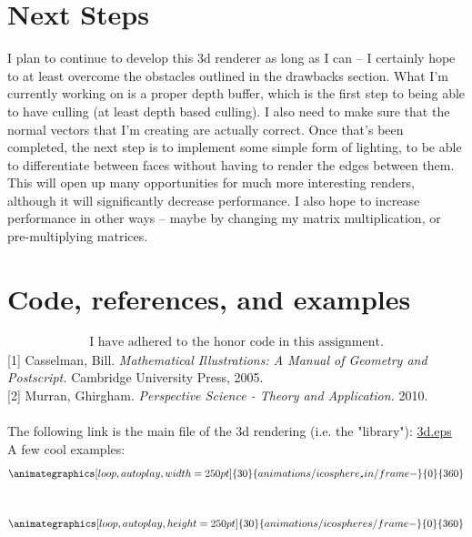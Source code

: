 \documentclass[12pt]{article}
\begin{document}
	\section{Next Steps}
	I plan to continue to develop this 3d renderer as long as I can -- I certainly hope to at least overcome the obstacles outlined in the drawbacks section. What I'm currently working on is a proper depth buffer, which is the first step to being able to have culling (at least depth based culling). I also need to make sure that the normal vectors that I'm creating are actually correct. Once that's been completed, the next step is to implement some simple form of lighting, to be able to differentiate between faces without having to render the edges between them. This will open up many opportunities for much more interesting renders, although it will significantly decrease performance. I also hope to increase performance in other ways -- maybe by changing my matrix multiplication, or pre-multiplying matrices. 
	\newpage
	\section{Code, references, and examples}
	\begin{align*}\text{I have adhered to the honor code in this assignment.}\end{align*}
	{[1]} Casselman, Bill. \textit{Mathematical Illustrations: A Manual of Geometry and Postscript.} Cambridge University Press, 2005.\\
	{[2]} Murran, Ghirgham. \textit{Perspective Science - Theory and Application.} 2010.\\\\
	The following link is the main file of the 3d rendering (i.e. the "library"):
	\href{https://gist.github.com/bn0367/3b670a37fc172aa1ae74cbbafd8cbb5a}{3d.eps}\\
	A few cool examples: 
	\begin{align*}\animategraphics[loop,autoplay,width=250pt]{30}{animations/icosphere_sin/frame-}{0}{360}\end{align*}\\
	\begin{align*}\animategraphics[loop,autoplay,height=250pt]{30}{animations/icospheres/frame-}{0}{360}\end{align*}\\
\end{document}
